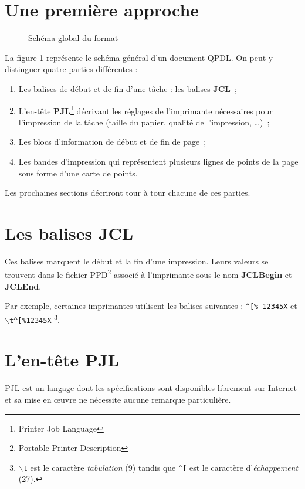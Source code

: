 \section{Une première approche}
\begin{figure}[!ht]

\caption{Schéma global du format}
\label{fig:schema_general}
\end{figure}

La figure \ref{fig:schema_general} représente le schéma général d'un
document QPDL. On peut y distinguer quatre parties différentes :
\begin{enumerate}
	\item Les balises de début et de fin d'une tâche : les balises 
		\textbf{JCL}~;
	\item L'en-tête \textbf{PJL}\footnote{Printer Job Language} décrivant
		les réglages de l'imprimante nécessaires pour l'impression
		de la tâche (taille du papier, qualité de l'impression,
		\ldots)~;
	\item Les blocs d'information de début et de fin de page~;
	\item Les bandes d'impression qui représentent plusieurs lignes de 
		points de la page sous forme d'une carte de points.
\end{enumerate}

Les prochaines sections décriront tour à tour chacune de ces parties.




\section{Les balises JCL}
Ces balises marquent le début et la fin d'une impression. Leurs valeurs se
trouvent dans le fichier PPD\footnote{Portable Printer Description} associé
à l'imprimante sous le nom \textbf{JCLBegin} et \textbf{JCLEnd}.
\medskip

Par exemple, certaines imprimantes utilisent les balises suivantes : 
\texttt{\^{}[\%-12345X} et \texttt{$\backslash$t\^{}[\%12345X}
\footnote{\texttt{$\backslash$t} est le caractère \emph{tabulation} (9) tandis 
que \texttt{\^{}[} est le caractère d'\emph{échappement} (27).}.




\section{L'en-tête PJL}
PJL est un langage dont les spécifications sont disponibles librement sur 
Internet et sa mise en \oe uvre ne nécessite aucune remarque particulière.

